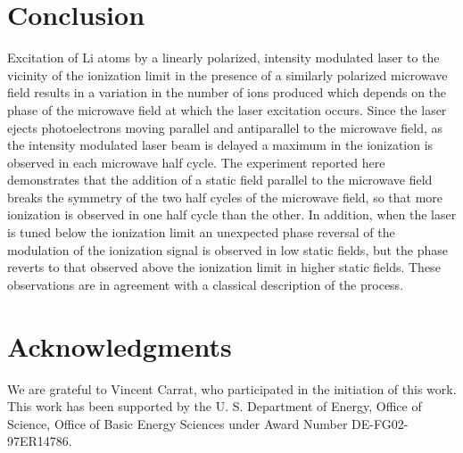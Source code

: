 \documentclass[aps,pra,reprint,groupedaddress]{revtex4-1}
\begin{document}
\section{\label{sec:conc} Conclusion}

Excitation of Li atoms by a linearly polarized, intensity modulated laser to the vicinity of the ionization limit in the presence of a similarly polarized microwave field results in a variation in the number of ions produced which depends on the phase of the microwave field at which the laser excitation occurs. Since the laser ejects photoelectrons moving parallel and antiparallel to the microwave field, as the intensity modulated laser beam is delayed a maximum in the ionization is observed in each microwave half cycle. The experiment reported here demonstrates that the addition of a static field parallel to the microwave field breaks the symmetry of the two half cycles of the microwave field, so that more ionization is observed in one half cycle than the other. In addition, when the laser is tuned below the ionization limit an unexpected phase reversal of the modulation of the ionization signal is observed in low static fields, but the phase reverts to that observed above the ionization limit in higher static fields. These observations are in agreement with a classical description of the process.

\section{\label{sec:ack} Acknowledgments}

We are grateful to Vincent Carrat, who participated in the initiation of this work. This work has been supported by the U. S. Department of Energy, Office of Science, Office of Basic Energy Sciences under Award Number DE-FG02-97ER14786.


\end{document}
